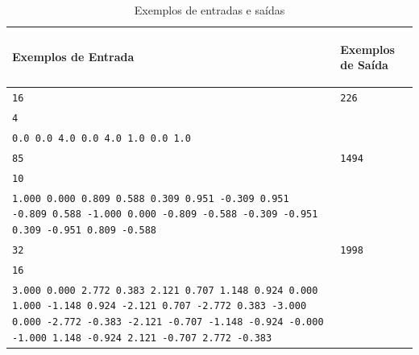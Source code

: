 {\begin{table}[ht]
    \centering
    \begin{tabular}{|p{12cm}|p{3cm}|}
        \hline
        \begin{center}
            \vspace{-0.3cm}
            \textbf{Exemplos de Entrada}
            \vspace{-0.3cm}
        \end{center} 
         &  
        \begin{center}
            \vspace{-0.3cm}
            \textbf{Exemplos de Saída}
            \vspace{-0.3cm}
        \end{center} \\ \hline
		    \texttt{16} & \texttt{226} \\
		    \texttt{4} & \texttt{} \\
		    \texttt{0.0 0.0 4.0 0.0 4.0 1.0 0.0 1.0} & \texttt{}\\
         \hline
		    \texttt{85} & \texttt{1494} \\
			\texttt{10} & \texttt{} \\
			\texttt{1.000 0.000 0.809 0.588 0.309 0.951 -0.309 0.951 -0.809 0.588 -1.000 0.000 -0.809 -0.588 -0.309 -0.951 0.309 -0.951 0.809 -0.588} & \texttt{}\\
         \hline    
            \texttt{32} & \texttt{1998} \\
        	\texttt{16} & \texttt{} \\
        	\texttt{3.000 0.000 2.772 0.383 2.121 0.707 1.148 0.924 0.000 1.000 -1.148 0.924 -2.121 0.707 -2.772 0.383 -3.000 0.000 -2.772 -0.383 -2.121 -0.707 -1.148 -0.924 -0.000 -1.000 1.148 -0.924 2.121 -0.707 2.772 -0.383} & \texttt{}\\
         \hline    
    \end{tabular}
    \caption{Exemplos de entradas e saídas}
    \label{tab:inputH}
\end{table}}



\newpage

\begin{center}
\noindent

\end{center}